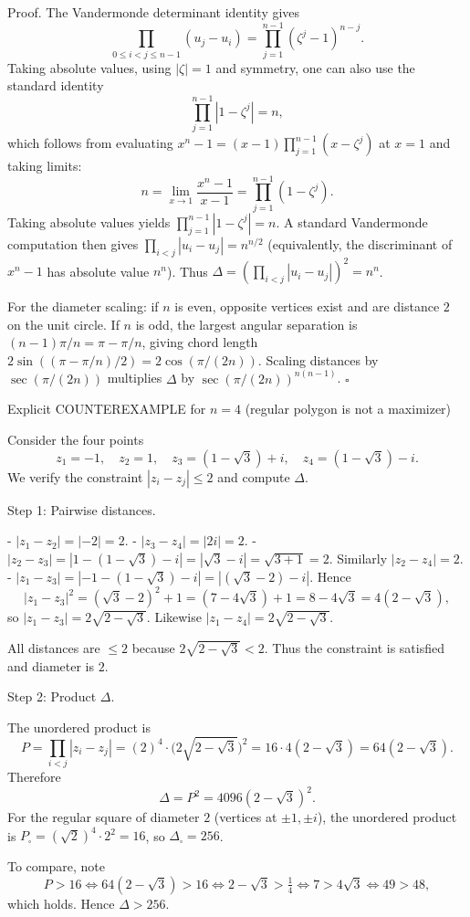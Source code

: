 Proof.
The Vandermonde determinant identity gives
\[
  \prod_{0\le i<j\le n-1} (u_j-u_i) = \prod_{j=1}^{n-1} (\zeta^j-1)^{n-j}.
\]
Taking absolute values, using $|\zeta|=1$ and symmetry, one can also use the standard identity
\[
  \prod_{j=1}^{n-1} |1-\zeta^j| = n,
\]
which follows from evaluating $x^n-1=(x-1)\prod_{j=1}^{n-1}(x-\zeta^j)$ at $x=1$ and taking limits:
\[
  n = \lim_{x\to 1} \frac{x^n-1}{x-1} = \prod_{j=1}^{n-1} (1-\zeta^j).
\]
Taking absolute values yields $\prod_{j=1}^{n-1}|1-\zeta^j|=n$.
A standard Vandermonde computation then gives
$\prod_{i<j}|u_i-u_j|=n^{n/2}$ (equivalently, the discriminant of $x^n-1$ has absolute value $n^n$).
Thus $\Delta=(\prod_{i<j}|u_i-u_j|)^2=n^n$.

For the diameter scaling: if $n$ is even, opposite vertices exist and are distance $2$ on the unit circle.
If $n$ is odd, the largest angular separation is $(n-1)\pi/n=\pi-\pi/n$, giving chord length
$2\sin((\pi-\pi/n)/2)=2\cos(\pi/(2n))$. Scaling distances by $\sec(\pi/(2n))$ multiplies
$\Delta$ by $\sec(\pi/(2n))^{n(n-1)}$.
$\square$

Explicit COUNTEREXAMPLE for $n=4$ (regular polygon is not a maximizer)

Consider the four points
\[
  z_1=-1,\quad z_2=1,\quad z_3=(1-\sqrt 3)+i,\quad z_4=(1-\sqrt 3)-i.
\]
We verify the constraint $|z_i-z_j|\le 2$ and compute $\Delta$.

Step 1: Pairwise distances.

- $|z_1-z_2|=|-2|=2$.
- $|z_3-z_4|=|2i|=2$.
- $|z_2-z_3| = |1-(1-\sqrt3)-i| = |\sqrt3-i|=\sqrt{3+1}=2$.
  Similarly $|z_2-z_4|=2$.
- $|z_1-z_3| = |-1-(1-\sqrt3)-i| = |(\sqrt3-2)-i|$.
  Hence
  \[
    |z_1-z_3|^2 = (\sqrt3-2)^2+1 = (7-4\sqrt3)+1 = 8-4\sqrt3 =4(2-\sqrt3),
  \]
  so $|z_1-z_3|=2\sqrt{2-\sqrt3}$. Likewise $|z_1-z_4|=2\sqrt{2-\sqrt3}$.

All distances are $\le 2$ because $2\sqrt{2-\sqrt3}<2$.
Thus the constraint is satisfied and diameter is $2$.

Step 2: Product $\Delta$.

The unordered product is
\[
  P=\prod_{i<j}|z_i-z_j| = (2)^4\cdot\bigl(2\sqrt{2-\sqrt3}\bigr)^2 = 16\cdot 4(2-\sqrt3)=64(2-\sqrt3).
\]
Therefore
\[
  \Delta = P^2 = 4096(2-\sqrt3)^2.
\]
For the regular square of diameter $2$ (vertices at $\pm 1,\pm i$), the unordered product is
$P_{\square}=(\sqrt2)^4\cdot 2^2=16$, so $\Delta_{\square}=256$.

To compare, note
\[
  P>16 \iff 64(2-\sqrt3)>16 \iff 2-\sqrt3>\tfrac14
  \iff 7>4\sqrt3 \iff 49>48,
\]
which holds.
Hence $\Delta>256$.

